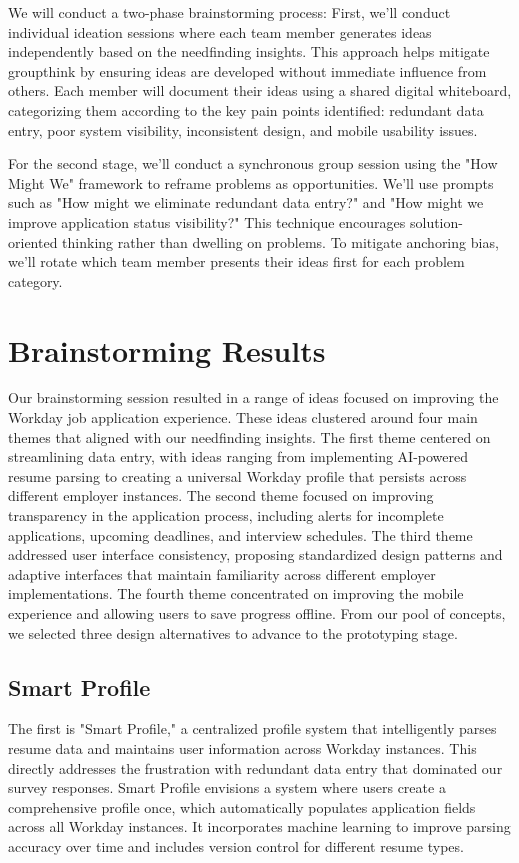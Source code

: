 \documentclass[
	letterpaper, %
]{jdf}
\begin{document}
\begin{sloppypar}
We will conduct a two-phase brainstorming process: First, we'll conduct individual ideation sessions where each team member generates ideas independently based on the needfinding insights. This approach helps mitigate groupthink by ensuring ideas are developed without immediate influence from others. Each member will document their ideas using a shared digital whiteboard, categorizing them according to the key pain points identified: redundant data entry, poor system visibility, inconsistent design, and mobile usability issues.

For the second stage, we'll conduct a synchronous group session using the "How Might We" framework to reframe problems as opportunities. We'll use prompts such as "How might we eliminate redundant data entry?" and "How might we improve application status visibility?" This technique encourages solution-oriented thinking rather than dwelling on problems. To mitigate anchoring bias, we'll rotate which team member presents their ideas first for each problem category.


\hfill \break
\newpage
\section{Brainstorming Results}
Our brainstorming session resulted in a range of ideas focused on improving the Workday job application experience. These ideas clustered around four main themes that aligned with our needfinding insights. The first theme centered on streamlining data entry, with ideas ranging from implementing AI-powered resume parsing to creating a universal Workday profile that persists across different employer instances. The second theme focused on improving transparency in the application process, including alerts for incomplete applications, upcoming deadlines, and interview schedules. The third theme addressed user interface consistency, proposing standardized design patterns and adaptive interfaces that maintain familiarity across different employer implementations. The fourth theme concentrated on improving the mobile experience and allowing users to save progress offline. From our pool of concepts, we selected three design alternatives to advance to the prototyping stage.

\subsection{Smart Profile}
The first is "Smart Profile," a centralized profile system that intelligently parses resume data and maintains user information across Workday instances. This directly addresses the frustration with redundant data entry that dominated our survey responses. Smart Profile envisions a system where users create a comprehensive profile once, which automatically populates application fields across all Workday instances. It incorporates machine learning to improve parsing accuracy over time and includes version control for different resume types. 


\end{sloppypar}
\end{document}
